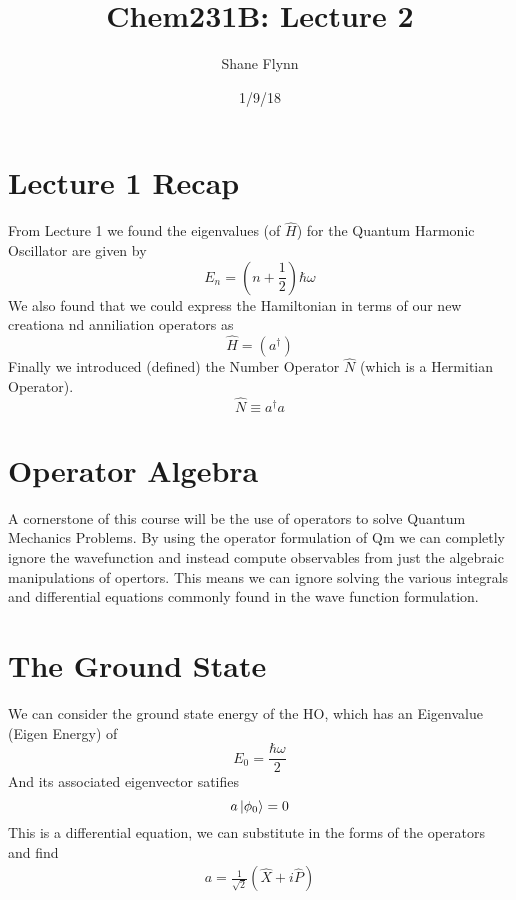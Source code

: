 \documentclass{article}
\title{Chem231B: Lecture 2}
\author{Shane Flynn}
\date{1/9/18}
\newcommand{\be}{\begin{equation}}
\newcommand{\ee}{\end{equation}}
\newcommand{\dg}{\dagger}
\begin{document}
\maketitle

\section*{Lecture 1 Recap}
From Lecture 1 we found the eigenvalues (of $\hat{H}$) for the Quantum Harmonic Oscillator are given by
\be
E_n = \left( n+\frac{1}{2} \right) \hbar \omega
\ee
We also found that we could express the Hamiltonian in terms of our new creationa nd anniliation operators as 
\be
\hat{H} = \left(a^\dg\right) 
\ee
Finally we introduced (defined) the Number Operator $\hat{N}$ (which is a Hermitian Operator). 
\be
\hat{N} \equiv a^\dg a
\ee

\section*{Operator Algebra}
A cornerstone of this course will be the use of operators to solve Quantum Mechanics Problems. 
By using the operator formulation of Qm we can completly ignore the wavefunction and instead compute observables from just the algebraic manipulations of opertors.
This means we can ignore solving the various integrals and differential equations commonly found in the wave function formulation. 

\section*{The Ground State}
We can consider the ground state energy of the HO, which has an Eigenvalue (Eigen Energy) of
\be
E_0 = \frac{\hbar \omega}{2}
\ee
And its associated eigenvector satifies
\be
a\ket{\phi_0} = 0
\ee
This is a differential equation, we can substitute in the forms of the operators and find
\be
\begin{split}
    a = \frac{1}{\sqrt{2}}\left(\hat{X} + i\hat{P}\right)
\end{split}
\ee
\end{document}
